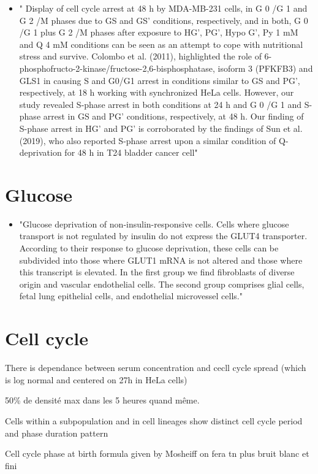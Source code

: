 \documentclass[11pt,a4paper]{article}
\begin{document}
\begin{itemize}
\item " Display of cell cycle arrest at 48 h by MDA-MB-231 cells, in G 0 /G 1 and G 2 /M phases due to GS and GS’ conditions, respectively, and in both, G 0 /G 1 plus G 2 /M phases after exposure to HG’, PG’, Hypo G’, Py 1 mM and Q 4 mM conditions can be seen as an attempt to cope with nutritional stress and survive. Colombo et al. (2011), highlighted the role of 6-phosphofructo-2-kinase/fructose-2,6-bisphosphatase, isoform 3 (PFKFB3) and GLS1
in causing S and G0/G1 arrest in conditions similar to GS and PG’, respectively, at 18 h working with synchronized HeLa cells. However, our study revealed S-phase arrest in both conditions at 24 h and G 0 /G 1 and S-phase arrest in GS and PG’ conditions, respectively, at 48 h. Our finding of S-phase arrest in HG’ and PG’ is corroborated by the findings of
Sun et al. (2019), who also reported S-phase arrest upon a similar condition of Q-deprivation for 48 h in T24 bladder cancer cell"\cite{Prasad2023}
\end{itemize}

\section{Glucose}
\begin{itemize}
\item "Glucose deprivation of non-insulin-responsive cells. Cells where glucose transport is not regulated by insulin do not express the GLUT4 transporter. According to their response to glucose deprivation, these cells can be subdivided into those where GLUT1 mRNA is not altered and those where this transcript is elevated. In the first group we find fibroblasts of diverse origin and vascular endothelial cells. The second group comprises glial cells, fetal lung epithelial cells, and endothelial microvessel cells." \cite{Klip1994}
\end{itemize}


\section{Cell cycle}
\item There is dependance between serum concentration and cecll cycle spread (which is log normal and centered on 27h in HeLa cells)\cite{Govindaraj2022}
\item 50\% de densité max dans les 5 heures quand même. \cite{Govindaraj2022}

\item Cells within a subpopulation and in cell lineages show distinct cell cycle period and phase duration pattern\cite{Govindaraj2022}

\item Cell cycle phase at birth formula given by Mosheiff on fera tn plus bruit blanc et fini
\newpage


\end{document}
